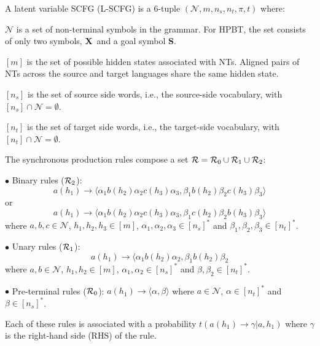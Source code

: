 \documentclass[11pt]{article}
\newcommand{\rules}{{\cal R}}
\newcommand{\bS}{{\bf S}}
\newcommand{\bX}{{\bf X}}
\newenvironment{itemizesquish}{\begin{list}{\setcounter{enumi}{0}\labelitemi}{\setlength{\itemsep}{-0.25em}\setlength{\labelwidth}{0.5em}\setlength{\leftmargin}{\labelwidth}\addtolength{\leftmargin}{\labelsep}}}{\end{list}}
\begin{document}
A latent variable SCFG (L-SCFG) is a 6-tuple $(\mathcal{N}, m, n_s, n_t, \pi, t)$ where: 
\begin{itemizesquish}
  \item $\mathcal{N}$ is a set of non-terminal symbols in the grammar.  
  	For HPBT, the set consists of only two symbols, \bX~and a goal symbol \bS.  
  \item $[m]$ is the set of possible hidden states associated with NTs.  
  	Aligned pairs of NTs across the source and target languages share the same hidden state.
   \item $[n_s]$ is the set of source side words, i.e., the source-side vocabulary, with $[n_s] \cap \mathcal{N} = \emptyset$.
   \item $[n_t]$ is the set of target side words, i.e., the target-side vocabulary, with $[n_t] \cap \mathcal{N} = \emptyset$.
   \item The synchronous production rules compose a set $\rules = \rules_0 \cup \rules_1 \cup \rules_2$:
   
$\bullet$ Binary rules ($\rules_2$): $$a(h_1) \rightarrow \langle \alpha_1 b(h_2) \alpha_2 c(h_3) \alpha_3, \beta_1 b(h_2) \beta_2 c(h_3) \beta_3 \rangle$$ or $$a(h_1) \rightarrow \langle \alpha_1 b(h_2) \alpha_2 c(h_3) \alpha_3, \beta_1 c(h_2) \beta_2 b(h_3) \beta_3 \rangle$$ where $a,b,c \in \mathcal{N}$, $h_1,h_2,h_3 \in [m]$, $\alpha_1,\alpha_2,\alpha_3 \in [n_s]^{\ast}$ and $\beta_1,\beta_2,\beta_3 \in [n_t]^{\ast}$.

$\bullet$ Unary rules ($\rules_1$): $$a(h_1) \rightarrow \langle \alpha_1 b(h_2) \alpha_2, \beta_1 b(h_2) \beta_2$$ where $a,b \in \mathcal{N}$, $h_1,h_2 \in [m]$, $\alpha_1,\alpha_2 \in [n_s]^{\ast}$ and $\beta,\beta_2 \in [n_t]^{\ast}$. 

$\bullet$ Pre-terminal rules ($\rules_0$): $a(h_1) \rightarrow \langle \alpha, \beta \rangle$ where $a \in \mathcal{N}$, $\alpha \in [n_t]^{\ast}$ and $\beta \in [n_s]^{\ast}$.

Each of these rules is associated with a probability $t(a(h_1) \rightarrow \gamma | a, h_1)$ where $\gamma$ is the right-hand side (RHS) of the rule.


\end{itemizesquish}
\end{document}
